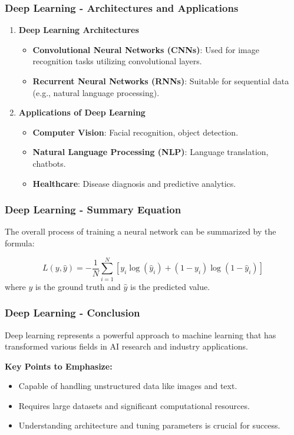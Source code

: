 \documentclass[aspectratio=169]{beamer}
\begin{document}
\begin{frame}[fragile]
    \frametitle{Deep Learning - Architectures and Applications}
    \begin{enumerate}
        \item \textbf{Deep Learning Architectures}
            \begin{itemize}
                \item \textbf{Convolutional Neural Networks (CNNs)}: Used for image recognition tasks utilizing convolutional layers.
                \item \textbf{Recurrent Neural Networks (RNNs)}: Suitable for sequential data (e.g., natural language processing).
            \end{itemize}
            
        \item \textbf{Applications of Deep Learning}
            \begin{itemize}
                \item \textbf{Computer Vision}: Facial recognition, object detection.
                \item \textbf{Natural Language Processing (NLP)}: Language translation, chatbots.
                \item \textbf{Healthcare}: Disease diagnosis and predictive analytics.
            \end{itemize}
    \end{enumerate}
\end{frame}

\begin{frame}[fragile]
    \frametitle{Deep Learning - Summary Equation}
    The overall process of training a neural network can be summarized by the formula:
    
    \begin{equation}
        L(y, \hat{y}) = -\frac{1}{N} \sum_{i=1}^{N} \left[y_i \log(\hat{y}_i) + (1 - y_i) \log(1 - \hat{y}_i)\right]
    \end{equation}
    where $y$ is the ground truth and $\hat{y}$ is the predicted value.
\end{frame}

\begin{frame}[fragile]
    \frametitle{Deep Learning - Conclusion}
    Deep learning represents a powerful approach to machine learning that has transformed various fields in AI research and industry applications.
    
    \textbf{Key Points to Emphasize:}
    \begin{itemize}
        \item Capable of handling unstructured data like images and text.
        \item Requires large datasets and significant computational resources.
        \item Understanding architecture and tuning parameters is crucial for success.
    \end{itemize}
\end{frame}
\end{document}

